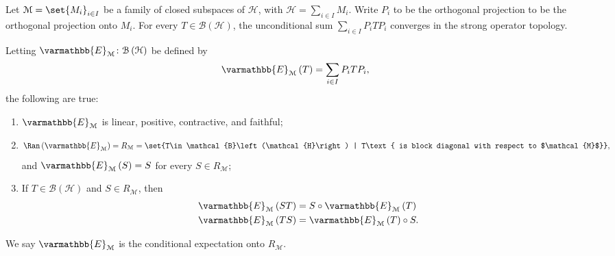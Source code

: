 \documentclass[10pt]{mypackage}
\renewcommand*{\mathbb}[1]{\varmathbb{#1}}
\begin{document}
\begin{proposition}
  Let $\mathcal{M} = \set{M_i}_{i\in I}$ be a family of closed subspaces of $\mathcal{H}$, with $\mathcal{H} = \sum_{i\in I}M_i$. Write $P_i$ to be the orthogonal projection to be the orthogonal projection onto $M_i$. For every $T\in \mathcal{B}\left(\mathcal{H}\right)$, the unconditional sum $\sum_{i\in I}P_iTP_i$ converges in the strong operator topology.\newline

  Letting $\mathbb{E}_{\mathcal{M}}\colon \mathcal{B}\left(\mathcal{H}\right)$ be defined by
  \begin{align*}
    \mathbb{E}_{\mathcal{M}}\left(T\right) &= \sum_{i\in I}P_iTP_i,
  \end{align*}
  the following are true:
  \begin{enumerate}[(1)]
    \item $\mathbb{E}_{\mathcal{M}}$ is linear, positive, contractive, and faithful;
    \item 
      \begin{align*}
        \Ran\left(\mathbb{E}_{\mathcal{M}}\right) = R_{\mathcal{M}} = \set{T\in \mathcal{B}\left(\mathcal{H}\right) | T\text{ is block diagonal with respect to $\mathcal{M}$}},
      \end{align*}
      and $\mathbb{E}_{\mathcal{M}}\left(S\right) = S$ for every $S\in R_{\mathcal{M}}$;
    \item If $T\in \mathcal{B}\left(\mathcal{H}\right)$ and $S\in R_{\mathcal{M}}$, then
      \begin{align*}
        \mathbb{E}_{\mathcal{M}}\left(ST\right) &= S\circ \mathbb{E}_{\mathcal{M}}\left(T\right)\\
        \mathbb{E}_{\mathcal{M}}\left(TS\right) &= \mathbb{E}_{\mathcal{M}}\left(T\right) \circ S.
      \end{align*}
  \end{enumerate}
  We say $\mathbb{E}_{\mathcal{M}}$ is the conditional expectation onto $R_{\mathcal{M}}$.
\end{proposition}
\end{document}
